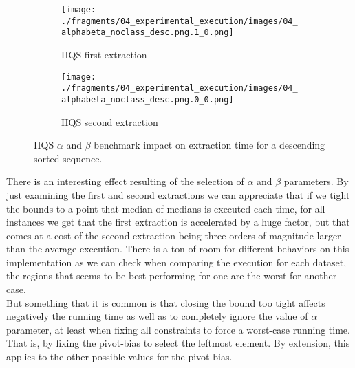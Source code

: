 \begin{figure}
    \centering
    \begin{subfigure}[b]{0.45\textwidth}
        \centering
        \texttt{[image: ./fragments/04\_experimental\_execution/images/04\_alphabeta\_noclass\_desc.png.1\_0.png]}
        \caption{IIQS first extraction}
        \label{FIG:05_ALPHABETA_RELATIONSHIP_DESC__0_0}
    \end{subfigure}
    \hfill
    \begin{subfigure}[b]{0.45\textwidth}
        \centering
        \texttt{[image: ./fragments/04\_experimental\_execution/images/04\_alphabeta\_noclass\_desc.png.0\_0.png]}
        \caption{IIQS second extraction}
        \label{FIG:05_ALPHABETA_RELATIONSHIP_DESC__0_1}
    \end{subfigure}

    \caption{IIQS $\alpha$ and $\beta$ benchmark impact on extraction time for a descending sorted sequence.}
    \label{FIG:05_ALPHABETA_RELATIONSHIP_DESC}
\end{figure}



There is an interesting effect resulting of the selection of $\alpha$ and $\beta$ parameters. By just examining the first and second extractions we can appreciate that if we tight the bounds to a point that median-of-medians is executed each time, for all instances we get that the first extraction is accelerated by a huge factor, but that comes at a cost of the second extraction being three orders of magnitude larger than the average execution. There is a ton of room for different behaviors on this implementation as we can check when comparing the execution for each dataset, the regions that seems to be best performing for one are the worst for another case.\\

But something that it is common is that closing the bound too tight affects negatively the running time as well as to completely ignore the value of $\alpha$ parameter, at least when fixing all constraints to force a worst-case running time. That is, by fixing the pivot-bias to select the leftmost element. By extension, this applies to the other possible values for the pivot bias. \\


